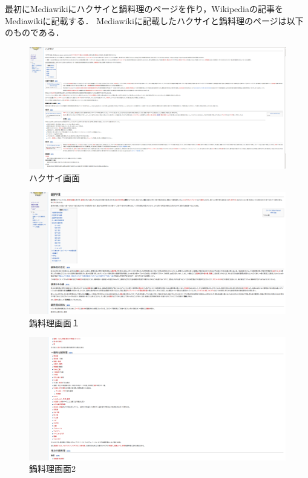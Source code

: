 最初にMediawikiにハクサイと鍋料理のページを作り，Wikipediaの記事をMediawikiに記載する．
Mediawikiに記載したハクサイと鍋料理のページは以下のものである．

\begin{figure}[!htb]
\centering
\includegraphics[width=18cm]{hakusai}
\caption{ハクサイ画面}\label{hakusai}
\end{figure}

\begin{figure}[!htb]
\centering
\includegraphics[width=18cm]{nabe}
\caption{鍋料理画面１}\label{nabe}
\end{figure}

\begin{figure}[!htb]
\centering
\includegraphics[width=18cm]{nabe2}
\caption{鍋料理画面2}\label{nabe2}
\end{figure}

